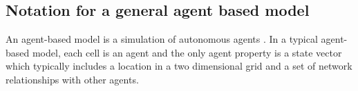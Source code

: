 





\subsection{Notation for a general agent based model}

An agent-based model is a simulation of autonomous agents \cite{shalizi_methods_2006}. %
In a typical agent-based model, each cell is an agent and the only agent property is a state vector which typically includes a location in a two dimensional grid and a set of network relationships with other agents. %


